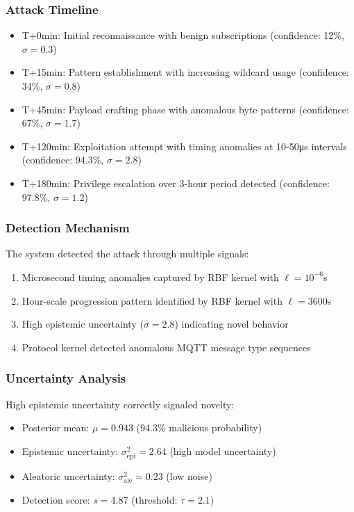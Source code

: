 \documentclass[12pt]{article}
\begin{document}
\subsubsection{Attack Timeline}
\begin{itemize}
\item T+0min: Initial reconnaissance with benign subscriptions (confidence: 12\%, $\sigma=0.3$)
\item T+15min: Pattern establishment with increasing wildcard usage (confidence: 34\%, $\sigma=0.8$)
\item T+45min: Payload crafting phase with anomalous byte patterns (confidence: 67\%, $\sigma=1.7$)
\item T+120min: Exploitation attempt with timing anomalies at 10-50μs intervals (confidence: 94.3\%, $\sigma=2.8$)
\item T+180min: Privilege escalation over 3-hour period detected (confidence: 97.8\%, $\sigma=1.2$)
\end{itemize}

\subsubsection{Detection Mechanism}
The system detected the attack through multiple signals:
\begin{enumerate}
\item Microsecond timing anomalies captured by RBF kernel with $\ell=10^{-6}$s
\item Hour-scale progression pattern identified by RBF kernel with $\ell=3600$s
\item High epistemic uncertainty ($\sigma=2.8$) indicating novel behavior
\item Protocol kernel detected anomalous MQTT message type sequences
\end{enumerate}

\subsubsection{Uncertainty Analysis}
High epistemic uncertainty correctly signaled novelty:
\begin{itemize}
\item Posterior mean: $\mu = 0.943$ (94.3\% malicious probability)
\item Epistemic uncertainty: $\sigma_{\text{epi}}^2 = 2.64$ (high model uncertainty)
\item Aleatoric uncertainty: $\sigma_{\text{ale}}^2 = 0.23$ (low noise)
\item Detection score: $s = 4.87$ (threshold: $\tau = 2.1$)
\end{itemize}
\end{document}
